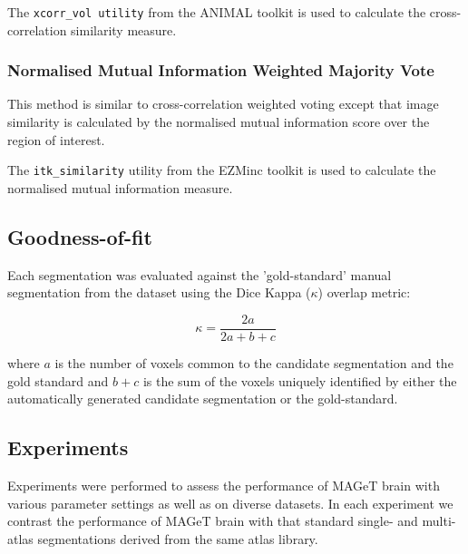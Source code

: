 \documentclass{article}\usepackage{graphicx, color}
\makeatletter
\newenvironment{kframe}{%
 \def\at@end@of@kframe{}%
 \ifinner\ifhmode%
  \def\at@end@of@kframe{\end{minipage}}%
  \begin{minipage}{\columnwidth}%
 \fi\fi%
 \def\FrameCommand##1{\hskip\@totalleftmargin \hskip-\fboxsep
 \colorbox{shadecolor}{##1}\hskip-\fboxsep
     \hskip-\linewidth \hskip-\@totalleftmargin \hskip\columnwidth}%
 \MakeFramed {\advance\hsize-\width
   \@totalleftmargin\z@ \linewidth\hsize
   \@setminipage}}%
 {\par\unskip\endMakeFramed%
 \at@end@of@kframe}
\newcommand{\todo}[1]{\begin{kframe}{\textcolor{red}{TODO #1}}\end{kframe}}
\makeatother
\begin{document}
The {\tt xcorr\_vol utility} from the ANIMAL toolkit is used to calculate the 
cross-correlation similarity measure.  
 
\subsubsection{Normalised Mutual Information Weighted Majority Vote}
 
This method is similar to cross-correlation weighted voting 
except that image similarity is calculated by the normalised 
mutual information score over the region of interest. \todo{reference?}
 
 
The {\tt itk\_similarity} utility from the EZMinc toolkit is used to calculate 
the normalised mutual information measure.


\subsection{Goodness-of-fit}

Each segmentation was evaluated against the 'gold-standard' manual segmentation
from the dataset using the Dice Kappa ($\kappa$) overlap metric:

\begin{equation*} 
\kappa=\frac{2a}{2a+b+c}
\end{equation*}

where $a$ is the number of voxels common to the candidate segmentation and the
gold standard and $b+c$ is the sum of the voxels uniquely identified by either
the automatically generated candidate segmentation or the gold-standard.
\todo{I would do this after you define the experiments}




\subsection{Experiments}

Experiments were performed to assess the performance of MAGeT brain with various 
parameter settings as well as on diverse datasets.  In each experiment we contrast 
the performance of MAGeT brain with that standard single- and multi-atlas 
segmentations derived from the same atlas library. 
\end{document}
